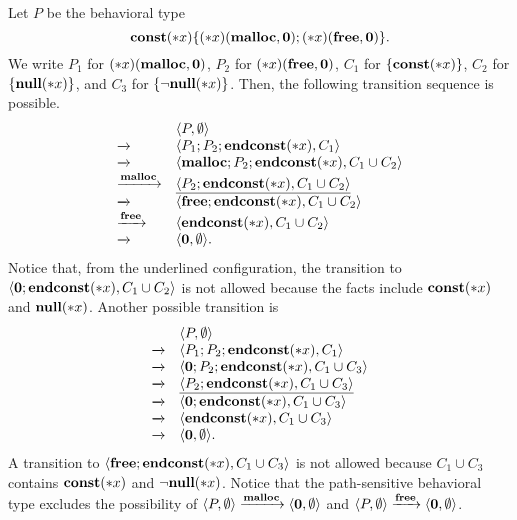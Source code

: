 \begin{exmp}
Let $P$ be the behavioral type
\[
 \mathbf{const}(*x)\{(*x)(\mathbf{malloc},\mathbf{0});(*x)(\mathbf{free},\mathbf{0})\}.
\]
We write $P_1$ for $(*x)(\mathbf{malloc},\mathbf{0})$, $P_2$ for
$(*x)(\mathbf{free},\mathbf{0})$, $C_1$ for $\{\mathbf{const}(*x)\}$, $C_2$ for
$\{\mathbf{null}(*x)\}$, and $C_3$ for $\{\neg\mathbf{null}(*x)\}$.  Then, the
following transition sequence is possible.
\[
 \begin{array}{ll}
                 & \langle P, \emptyset \rangle\\
  \xrightarrow{} & \langle P_1;P_2;\mathbf{endconst}(*x), C_1 \rangle\\
  \xrightarrow{} & \langle \mathbf{malloc};P_2;\mathbf{endconst}(*x), C_1 \cup C_2 \rangle\\
  \xrightarrow{\mathbf{malloc}} & \underline{\langle P_2;\mathbf{endconst}(*x), C_1 \cup C_2 \rangle}\\
  \xrightarrow{} & \langle \mathbf{free};\mathbf{endconst}(*x), C_1 \cup C_2 \rangle\\
  \xrightarrow{\mathbf{free}} & \langle \mathbf{endconst}(*x), C_1 \cup C_2 \rangle\\
  \xrightarrow{} & \langle \mathbf{0}, \emptyset \rangle.\\
 \end{array}
\]
Notice that, from the underlined configuration, the transition to
$\langle \mathbf{0};\mathbf{endconst}(*x), C_1 \cup C_2 \rangle$ is not allowed
because the facts include $\mathbf{const}(*x)$ and $\mathbf{null}(*x)$.  Another possible
transition is
\[
 \begin{array}{ll}
                 & \langle P, \emptyset \rangle\\
  \xrightarrow{} & \langle P_1;P_2;\mathbf{endconst}(*x), C_1 \rangle\\
  \xrightarrow{} & \langle \mathbf{0};P_2;\mathbf{endconst}(*x), C_1 \cup C_3 \rangle\\
  \xrightarrow{} & \underline{\langle P_2;\mathbf{endconst}(*x), C_1 \cup C_3 \rangle}\\
  \xrightarrow{} & \langle \mathbf{0};\mathbf{endconst}(*x), C_1 \cup C_3 \rangle\\
  \xrightarrow{} & \langle \mathbf{endconst}(*x), C_1 \cup C_3 \rangle\\
  \xrightarrow{} & \langle \mathbf{0}, \emptyset \rangle.\\
 \end{array}
\]
A transition to $\langle \mathbf{free};\mathbf{endconst}(*x), C_1 \cup C_3 \rangle$ is not
allowed because $C_1 \cup C_3$ contains $\mathbf{const}(*x)$ and $\neg\mathbf{null}(*x)$.
Notice that the path-sensitive behavioral type excludes the possibility
of $\langle P, \emptyset \rangle \xrightarrow{\mathbf{malloc}} \langle
\mathbf{0}, \emptyset \rangle$ and $\langle P, \emptyset \rangle
\xrightarrow{\mathbf{free}} \langle \mathbf{0}, \emptyset \rangle$.
\end{exmp}

